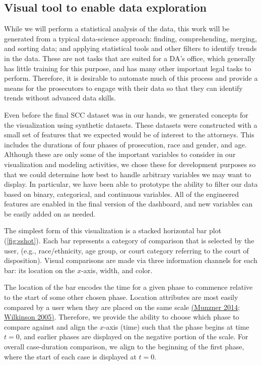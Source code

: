 \subsection{Visual tool to enable data exploration}

While we will perform a statistical analysis of the data, this work
will be generated from a typical data-science approach: finding,
comprehending, merging, and sorting data; and applying statistical
tools and other filters to identify trends in the data. These are not
tasks that are suited for a DA's office, which generally has little
training for this purpose, and has many other important legal tasks to
perform. Therefore, it is desirable to automate much of this process
and provide a means for the prosecutors to engage with their data so
that they can identify trends without advanced data skills.

Even before the final SCC dataset was in our hands, we generated
concepts for the visualization using synthetic datasets. These
datasets were constructed with a small set of features that we
expected would be of interest to the attorneys. This includes the
durations of four phases of prosecution, race and gender, and
age. Although these are only some of the important variables to
consider in our visualization and modeling activities, we chose these
for development purposes so that we could determine how best to handle
arbitrary variables we may want to display. In particular, we have
been able to prototype the ability to filter our data based on binary,
categorical, and continuous variables. All of the engineered features
are enabled in the final version of the dashboard, and new variables
can be easily added on as needed.

The simplest form of this visualization is a stacked horizontal bar
plot (\autoref{fig:sshot}). Each bar represents a category of
comparison that is selected by the user, (e.g., race/ethnicity, age
group, or court category referring to the court of
disposition). Visual comparisons are made via three information
channels for each bar: its location on the $x$-axis, width, and color.

The location of the bar encodes the time for a given phase to commence
relative to the start of some other chosen phase. Location attributes
are most easily compared by a user when they are placed on the same
scale \hyperref[csl:13]{(Munzner 2014}; \hyperref[csl:14]{Wilkinson
  2005)}. Therefore, we provide the ability to choose which phase to
compare against and align the $x$-axis (time) such that the phase
begins at time $t = 0$, and earlier phases are displayed on the
negative portion of the scale. For overall case-duration comparison,
we align to the beginning of the first phase, where the start of each
case is displayed at $t = 0$.
